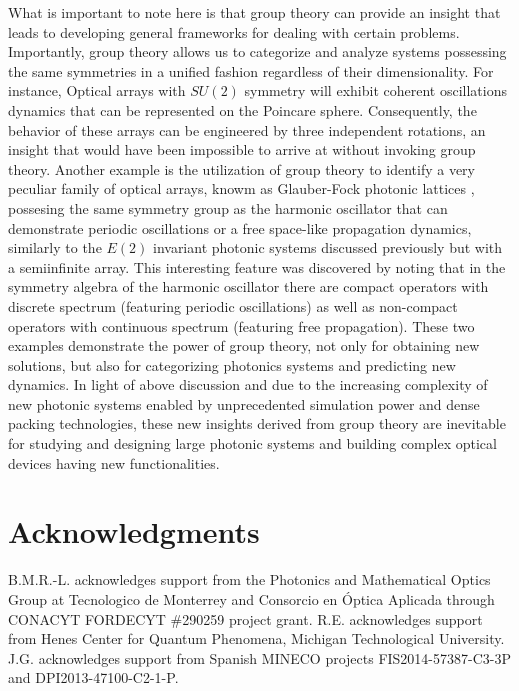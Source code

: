 \documentclass[12pt]{iopart}
\begin{document}
What is important to note here is that group theory can provide an insight that leads to developing general frameworks for dealing with certain problems. Importantly, group theory allows us to categorize and analyze systems possessing the same symmetries in a unified fashion regardless of their dimensionality. For instance, Optical arrays with $SU(2)$ symmetry will exhibit coherent oscillations dynamics that can be represented on the Poincare sphere. Consequently, the behavior of these arrays can be engineered by three independent rotations, an insight that would have been impossible to arrive at without invoking group theory.
Another example is the utilization of group theory to identify a very peculiar family of optical arrays, knowm as Glauber-Fock photonic lattices \cite{GlauberFock}, possesing the same symmetry group as the  harmonic oscillator \cite{GilmorePerelomovCS} that can demonstrate periodic oscillations or a free space-like propagation dynamics, similarly to the $E(2)$ invariant photonic systems discussed previously but
with a semiinfinite array. This interesting feature was discovered by noting that in the symmetry algebra of the harmonic oscillator there are compact operators
with discrete spectrum (featuring periodic oscillations) as well as non-compact operators with continuous spectrum (featuring free propagation). These two examples demonstrate the power of group theory, not only for obtaining new solutions, but also for categorizing photonics systems and predicting new dynamics.
In light of above discussion and due to the increasing complexity of new photonic systems enabled by unprecedented simulation power and dense packing technologies, these new insights derived from group theory are inevitable for studying and designing large photonic systems and building complex optical devices having new functionalities.

\section*{Acknowledgments}

B.M.R.-L. acknowledges support from the Photonics and Mathematical Optics Group at Tecnologico de Monterrey and Consorcio en \'Optica Aplicada through CONACYT FORDECYT $\#$290259 project grant.
R.E. acknowledges support from Henes Center for Quantum Phenomena, Michigan Technological University.
J.G. acknowledges support from Spanish MINECO projects FIS2014-57387-C3-3P and DPI2013-47100-C2-1-P.
\end{document}
